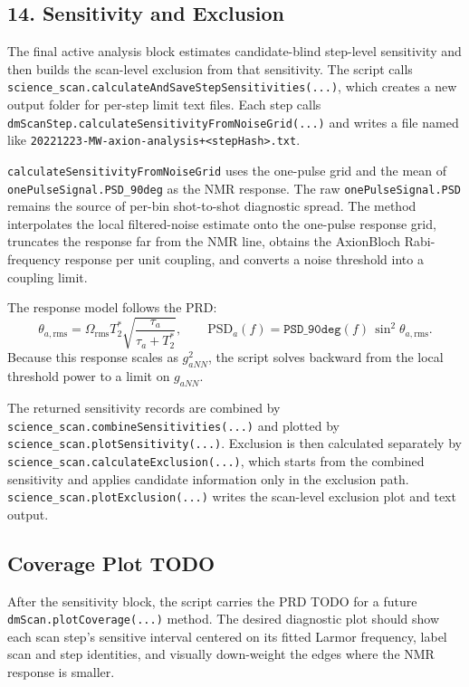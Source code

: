 \documentclass[11pt]{article}
\newcommand{\code}[1]{\texttt{#1}}
\begin{document}
\subsection{14. Sensitivity and Exclusion}

The final active analysis block estimates candidate-blind step-level
sensitivity and then builds the scan-level exclusion from that sensitivity.
The script calls \code{science\_scan.calculateAndSaveStepSensitivities(...)},
which creates a new output folder for per-step limit text files. Each step
calls \code{dmScanStep.calculateSensitivityFromNoiseGrid(...)} and writes a
file named like
\code{20221223-MW-axion-analysis+<stepHash>.txt}.

\code{calculateSensitivityFromNoiseGrid} uses the one-pulse grid and the mean
of \code{onePulseSignal.PSD\_90deg} as the NMR response. The raw
\code{onePulseSignal.PSD} remains the source of per-bin shot-to-shot
diagnostic spread. The method interpolates the local filtered-noise estimate
onto the one-pulse response grid, truncates the response far from the NMR
line, obtains the AxionBloch Rabi-frequency response per unit coupling, and
converts a noise threshold into a coupling limit.

The response model follows the PRD:
\[
  \theta_{a,\mathrm{rms}}
  =
  \Omega_{\mathrm{rms}} T_2^*
  \sqrt{\frac{\tau_a}{\tau_a + T_2^*}},
  \qquad
  \mathrm{PSD}_a(f)
  =
  \code{PSD\_90deg}(f)\,\sin^2\theta_{a,\mathrm{rms}}.
\]
Because this response scales as \(g_{aNN}^2\), the script solves backward from
the local threshold power to a limit on \(g_{aNN}\).

The returned sensitivity records are combined by
\code{science\_scan.combineSensitivities(...)} and plotted by
\code{science\_scan.plotSensitivity(...)}. Exclusion is then calculated
separately by \code{science\_scan.calculateExclusion(...)}, which starts from
the combined sensitivity and applies candidate information only in the
exclusion path. \code{science\_scan.plotExclusion(...)} writes the scan-level
exclusion plot and text output.

\subsection{Coverage Plot TODO}

After the sensitivity block, the script carries the PRD TODO for a future
\code{dmScan.plotCoverage(...)} method. The desired diagnostic plot should show
each scan step's sensitive interval centered on its fitted Larmor frequency,
label scan and step identities, and visually down-weight the edges where the
NMR response is smaller.
\end{document}
